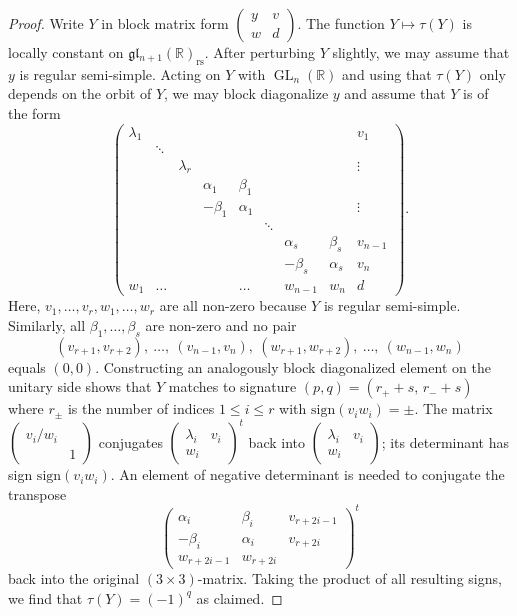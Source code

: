 \documentclass[reqno, 11pt]{amsart} %
\numberwithin{equation}{section}
\theoremstyle{plain}
\theoremstyle{definition}
\theoremstyle{remark}
\newcommand{\mr}{\mathrm}
\newcommand{\mbR}{\mathbb{R}}
\newcommand{\mfg}{\mathfrak{g}}
\newcommand{\mfl}{\mathfrak{l}}
\newcommand{\rs}{\mr{rs}}
\newcommand{\mfgl}{\mfg\mfl}
\DeclareMathOperator{\GL}{GL}
\begin{document}
\begin{proof}
Write $Y$ in block matrix form $\left(\begin{smallmatrix} y & v \\ w & d\end{smallmatrix}\right)$. The function $Y\mapsto τ(Y)$ is locally constant on $\mfgl_{n+1}(\mbR)_\rs$. After perturbing $Y$ slightly, we may assume that $y$ is regular semi-simple. Acting on $Y$ with $\GL_n(\mbR)$ and using that $τ(Y)$ only depends on the orbit of $Y$, we may block diagonalize $y$ and assume that $Y$ is of the form
\begin{equation}\label{eq:block_diag_general}
\begin{pmatrix}
λ_1 &    & & & & & & & v_1 \\
& \ddots & & & & & & & \\
& & λ_r    & & & & & & \vdots \\
& & & α_1 & β_1 & & & & \\
& & & -β_1 & α_1 & & & & \vdots \\
& & & & & \ddots & & & \\
& & & & & & α_s & β_s & v_{n-1} \\
& & & & & & -β_s & α_s & v_n \\
w_1 & \hdots & & & \hdots & & w_{n-1}& w_n & d
\end{pmatrix}.
\end{equation}
Here, $v_1,\ldots,v_r,w_1,\ldots,w_r$ are all non-zero because $Y$ is regular semi-simple. Similarly, all $β_1,\ldots,β_s$ are non-zero and no pair
$$(v_{r+1},v_{r+2}),\ \ldots,\ (v_{n-1},v_n),\ (w_{r+1},w_{r+2}),\ \ldots,\ (w_{n-1},w_n)$$
equals $(0,0)$. Constructing an analogously block diagonalized element on the unitary side shows that $Y$ matches to signature $(p, q) = (r_+ + s,\, r_- + s)$ where $r_{\pm}$ is the number of indices $1\leq i\leq r$ with $\mr{sign}(v_iw_i) = \pm$. The matrix $\left(\begin{smallmatrix} v_i/w_i & \\ & 1 \end{smallmatrix}\right)$ conjugates $\left(\begin{smallmatrix} λ_i & v_i \\ w_i & \end{smallmatrix}\right)^t$ back into $\left(\begin{smallmatrix} λ_i & v_i\\ w_i & \end{smallmatrix}\right)$; its determinant has sign $\mr{sign}(v_iw_i)$. An element of negative determinant is needed to conjugate the transpose
$$\begin{pmatrix}
α_i & β_i & v_{r + 2i - 1} \\
-β_i & α_i & v_{r + 2i}\\
w_{r + 2i - 1} & w_{r + 2i} &
\end{pmatrix}^t$$
back into the original $(3\times 3)$-matrix. Taking the product of all resulting signs, we find that $τ(Y) = (-1)^q$ as claimed.
\end{proof}
\end{document}
